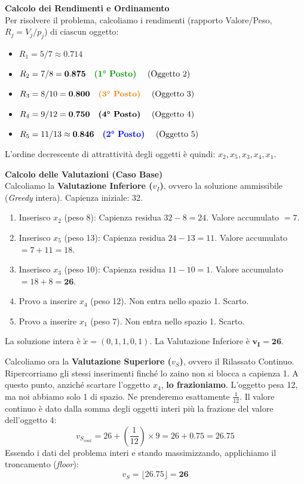 \documentclass[12pt, a4paper]{article}
\begin{document}
	\vspace{0.4cm}
	\textbf{Calcolo dei Rendimenti e Ordinamento}\\
	Per risolvere il problema, calcoliamo i rendimenti (rapporto Valore/Peso, $R_j = V_j / p_j$) di ciascun oggetto:
	\begin{itemize}[label=$\circ$, itemsep=2pt, leftmargin=1.5cm]
		\item $R_1 = 5 / 7 \approx 0.714$
		\item $R_2 = 7 / 8 = \mathbf{0.875} \quad \text{\textcolor{green!60!black}{\textbf{(1° Posto)}} \quad (Oggetto 2)}$
		\item $R_3 = 8 / 10 = \mathbf{0.800} \quad \text{\textcolor{orange}{\textbf{(3° Posto)}} \quad (Oggetto 3)}$
		\item $R_4 = 9 / 12 = \mathbf{0.750} \quad \text{\textbf{(4° Posto)} \quad (Oggetto 4)}$
		\item $R_5 = 11 / 13 \approx \mathbf{0.846} \quad \text{\textcolor{blue}{\textbf{(2° Posto)}} \quad (Oggetto 5)}$
	\end{itemize}
	L'ordine decrescente di attrattività degli oggetti è quindi: \textbf{$x_2, x_5, x_3, x_4, x_1$}.
	
	\vspace{0.4cm}
	\textbf{Calcolo delle Valutazioni (Caso Base)}\\
	Calcoliamo la \textbf{Valutazione Inferiore ($v_I$)}, ovvero la soluzione ammissibile (\textit{Greedy} intera). 
	Capienza iniziale: 32.
	\begin{enumerate}
		\item Inserisco $x_2$ (peso 8): Capienza residua $32 - 8 = 24$. Valore accumulato $= 7$.
		\item Inserisco $x_5$ (peso 13): Capienza residua $24 - 13 = 11$. Valore accumulato $= 7 + 11 = 18$.
		\item Inserisco $x_3$ (peso 10): Capienza residua $11 - 10 = 1$. Valore accumulato $= 18 + 8 = \mathbf{26}$.
		\item Provo a inserire $x_4$ (peso 12). Non entra nello spazio 1. Scarto.
		\item Provo a inserire $x_1$ (peso 7). Non entra nello spazio 1. Scarto.
	\end{enumerate}
	La soluzione intera è $\tilde{x} = (0, 1, 1, 0, 1)$. La Valutazione Inferiore è $\mathbf{v_I = 26}$.
	
	Calcoliamo ora la \textbf{Valutazione Superiore ($v_S$)}, ovvero il Rilassato Continuo. 
	Ripercorriamo gli stessi inserimenti finché lo zaino non si blocca a capienza 1. A questo punto, anziché scartare l'oggetto $x_4$, \textbf{lo frazioniamo}. L'oggetto pesa 12, ma noi abbiamo solo 1 di spazio. Ne prenderemo esattamente $\frac{1}{12}$.
	Il valore continuo è dato dalla somma degli oggetti interi più la frazione del valore dell'oggetto 4:
	\[
	v_{S_{cont}} = 26 + \left(\frac{1}{12}\right) \times 9 = 26 + 0.75 = 26.75
	\]
	Essendo i dati del problema interi e stando massimizzando, applichiamo il troncamento (\textit{floor}):
	\[
	v_S = \lfloor 26.75 \rfloor = \mathbf{26}
	\]
	
\end{document}
